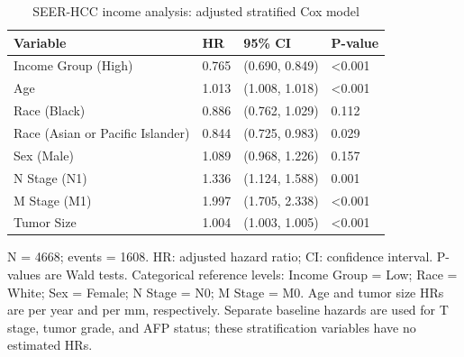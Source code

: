 \begin{table}[!htbp]
\centering
\small
\caption{SEER-HCC income analysis: adjusted stratified Cox model}
\begin{tabular}{llll}
\toprule
Variable & HR & 95\% CI & P-value \\
\midrule
Income Group (High) & 0.765 & (0.690, 0.849) & \textless{}0.001 \\
Age & 1.013 & (1.008, 1.018) & \textless{}0.001 \\
Race (Black) & 0.886 & (0.762, 1.029) & 0.112 \\
Race (Asian or Pacific Islander) & 0.844 & (0.725, 0.983) & 0.029 \\
Sex (Male) & 1.089 & (0.968, 1.226) & 0.157 \\
N Stage (N1) & 1.336 & (1.124, 1.588) & 0.001 \\
M Stage (M1) & 1.997 & (1.705, 2.338) & \textless{}0.001 \\
Tumor Size & 1.004 & (1.003, 1.005) & \textless{}0.001 \\
\bottomrule
\end{tabular}
\begin{minipage}{0.95\linewidth}
\vspace{0.5em}
\footnotesize N = 4668; events = 1608. HR: adjusted hazard ratio; CI: confidence interval. P-values are Wald tests. Categorical reference levels: Income Group = Low; Race = White; Sex = Female; N Stage = N0; M Stage = M0. Age and tumor size HRs are per year and per mm, respectively. Separate baseline hazards are used for T stage, tumor grade, and AFP status; these stratification variables have no estimated HRs.
\end{minipage}
\end{table}
